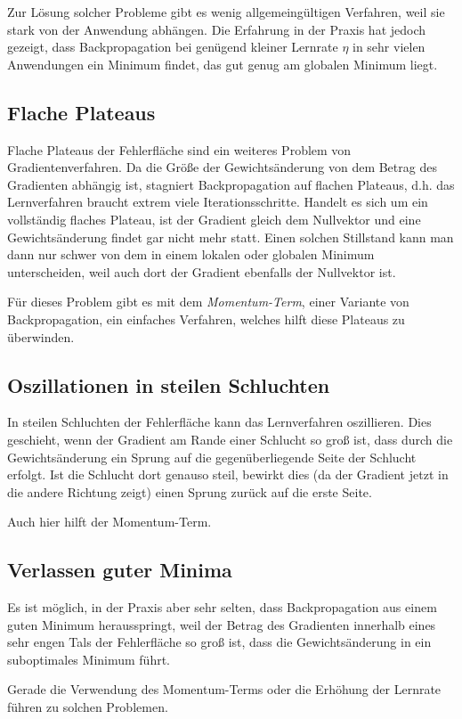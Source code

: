 Zur Lösung solcher Probleme gibt es wenig allgemeingültigen Verfahren, weil sie stark von der Anwendung abhängen.
Die Erfahrung in der Praxis hat jedoch gezeigt, dass Backpropagation bei genügend kleiner Lernrate $\eta$ in sehr vielen Anwendungen ein Minimum findet, das gut genug am globalen Minimum liegt.

\subsection*{Flache Plateaus}
Flache Plateaus der Fehlerfläche sind ein weiteres Problem von Gradientenverfahren. Da die Größe der Gewichtsänderung von dem Betrag des Gradienten abhängig ist, stagniert Backpropagation auf flachen Plateaus, d.h. das Lernverfahren braucht extrem viele Iterationsschritte. 
Handelt es sich um ein vollständig flaches Plateau, ist der Gradient gleich dem Nullvektor und eine Gewichtsänderung findet gar nicht mehr statt.
Einen solchen Stillstand kann man dann nur schwer von dem in einem lokalen oder globalen Minimum unterscheiden, weil auch dort der Gradient ebenfalls der Nullvektor ist.

Für dieses Problem gibt es mit dem \emph{Momentum-Term}, einer Variante von Backpropagation, ein einfaches Verfahren, welches hilft diese Plateaus zu überwinden.

\subsection*{Oszillationen in steilen Schluchten}
In steilen Schluchten der Fehlerfläche kann das Lernverfahren oszillieren. Dies geschieht, wenn der Gradient am Rande einer Schlucht so groß ist, dass durch die Gewichtsänderung ein Sprung auf die gegenüberliegende Seite der Schlucht erfolgt. Ist die Schlucht dort genauso steil, bewirkt dies (da der Gradient jetzt in die andere Richtung zeigt) einen Sprung zurück auf die erste Seite.

Auch hier hilft der Momentum-Term.

\subsection*{Verlassen guter Minima}
Es ist möglich, in der Praxis aber sehr selten, dass Backpropagation aus einem guten Minimum herausspringt, weil der Betrag des Gradienten innerhalb eines sehr engen Tals der Fehlerfläche so groß ist, dass die Gewichtsänderung in ein suboptimales Minimum führt.

Gerade die Verwendung des Momentum-Terms oder die Erhöhung der Lernrate führen zu solchen Problemen.

